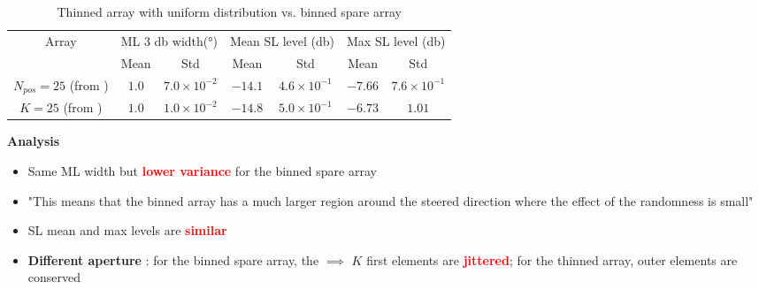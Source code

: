 \documentclass[UKenglish,8pt,aspectratio=1610]{beamer}
\begin{document}
\begin{frame}
		\begin{table}
			\begin{tabular}{ccccccc}
				\hline
				\multirow{2}{*}{Array} &
				\multicolumn{2}{c}{ML 3 \si{\decibel} width(\si{\degree})} &
				\multicolumn{2}{c}{Mean SL level (\si{\decibel})} &
				\multicolumn{2}{c}{Max SL level (\si{\decibel})} \\
				& {Mean} & {Std} & {Mean} & {Std} & {Mean} & {Std} \\
				\hline
				\hline
				$N_{pos}=25$ (from \cite{Nonuniformly_spaced_linear}) & $1.0$ & $7.0\times 10^{-2}$ & $-14.1$& $4.6\times 10^{-1}$ & $-7.66$ & $7.6\times 10^{-1}$ \\
				$K=25$ (from \cite{Sampling_theory})&$1.0$&$1.0\times 10^{-2}$&$-14.8$&$5.0\times 10^{-1}$&$-6.73$&$1.01$\\
				\hline
			\end{tabular}
			\centering
			\caption{Thinned array with uniform distribution vs. binned spare array}
		\end{table}
\textbf{Analysis}
		\begin{itemize}
			\item Same ML width but \textcolor{red}{\textbf{lower variance}} for the binned spare array
			\item "This means that the binned array has a much larger region around the steered direction where the effect of the randomness is small" \cite{Sampling_theory}
			\item SL mean and max levels are \textcolor{red}{\textbf{similar}}
			\item\textbf{Different aperture} : for the binned spare array, the $\implies$ $K$ first elements are \textcolor{red}{\textbf{jittered}}; for the thinned array, outer elements are conserved
		\end{itemize}
\end{frame}
\end{document}
